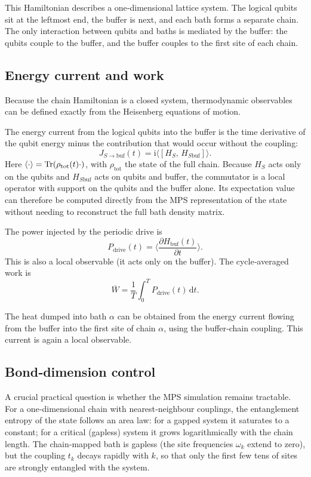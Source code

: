 \documentclass[11pt,a4paper]{article}
\theoremstyle{definition}
\theoremstyle{remark}
\newcommand{\ii}{\mathrm{i}}
\renewcommand{\d}{\mathrm{d}}
\begin{document}
This Hamiltonian describes a one‑dimensional lattice system. The logical qubits sit at the leftmost end, the buffer is next, and each bath forms a separate chain. The only interaction between qubits and baths is mediated by the buffer: the qubits couple to the buffer, and the buffer couples to the first site of each chain.

\subsection{Energy current and work}
Because the chain Hamiltonian is a closed system, thermodynamic observables can be defined exactly from the Heisenberg equations of motion.

The energy current from the logical qubits into the buffer is the time derivative of the qubit energy minus the contribution that would occur without the coupling:
\begin{equation}\label{eq:current_def}
J_{S\to\text{buf}}(t) = \ii\big\langle [H_S,\, H_{S\text{buf}}] \big\rangle.
\end{equation}
Here $\langle\cdot\rangle = \Tr(\rho_{\text{tot}}(t)\cdot)$, with $\rho_{\text{tot}}$ the state of the full chain. Because $H_S$ acts only on the qubits and $H_{S\text{buf}}$ acts on qubits and buffer, the commutator is a local operator with support on the qubits and the buffer alone. Its expectation value can therefore be computed directly from the MPS representation of the state without needing to reconstruct the full bath density matrix.

The power injected by the periodic drive is
\begin{equation}\label{eq:power_def}
P_{\text{drive}}(t) = \Big\langle \frac{\partial H_{\text{buf}}(t)}{\partial t} \Big\rangle.
\end{equation}
This is also a local observable (it acts only on the buffer). The cycle‑averaged work is
\begin{equation}
\overline{W} = \frac1T \int_0^T P_{\text{drive}}(t)\,\d t.
\end{equation}

The heat dumped into bath $\alpha$ can be obtained from the energy current flowing from the buffer into the first site of chain $\alpha$, using the buffer‑chain coupling. This current is again a local observable.

\subsection{Bond‑dimension control}
A crucial practical question is whether the MPS simulation remains tractable. For a one‑dimensional chain with nearest‑neighbour couplings, the entanglement entropy of the state follows an area law: for a gapped system it saturates to a constant; for a critical (gapless) system it grows logarithmically with the chain length. The chain‑mapped bath is gapless (the site frequencies $\omega_k$ extend to zero), but the coupling $t_k$ decays rapidly with $k$, so that only the first few tens of sites are strongly entangled with the system.
\end{document}
